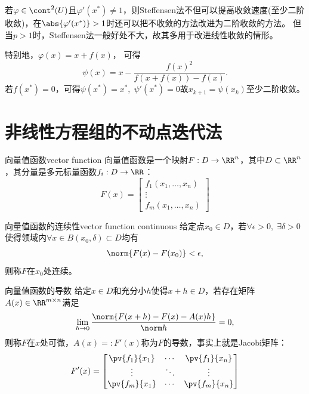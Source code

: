 \begin{remark}
    若$\varphi\in\cont^2(U)$且$\varphi'(x^*)\neq 1$，则Steffensen法不但可以提高收敛速度(至少二阶收敛)，在$\abs{\varphi'(x^*)}>1$时还可以把不收敛的方法改进为二阶收敛的方法。
    但当$p>1$时，Steffensen法一般好处不大，故其多用于改进线性收敛的情形。
\end{remark}

\begin{example}
    {}{}
    特别地，$\varphi(x)=x+f(x)$，
    可得
    \begin{equation}
        \psi(x)=x-\frac{f(x)^2}{f(x+f(x))-f(x)}.
    \end{equation}
    若$f(x^*)=0$，可得$\psi(x^*)=x^*,\;\psi'(x^*)=0$故$x_{k+1}=\psi(x_k)$至少二阶收敛。
\end{example}

\section{非线性方程组的不动点迭代法}

\begin{definition}
    {向量值函数}{vector function}
    向量值函数是一个映射$F:D\to\RR^n$，其中$D\subset\RR^n$，其分量是多元标量函数$f_i:D\to\RR$：
    \begin{equation}
        F(x)=\begin{bmatrix}
            f_1(x_1,\ldots,x_n)\\\vdots\\f_m(x_1,\ldots,x_n)
        \end{bmatrix}
    \end{equation}
\end{definition}

\begin{definition}
    {向量值函数的连续性}{vector function continuous}
    给定点$x_0\in D$，若$\forall\epsilon>0,\;\exists\delta>0$使得领域内$\forall x\in B(x_0,\delta)\subset D$均有
    \[
        \norm{F(x)-F(x_0)}<\epsilon,
    \]
    则称$F$在$x_0$处连续。
\end{definition}

\begin{definition}
    {向量值函数的导数}{}
    给定$x\in D$和充分小$h$使得$x+h\in D$，若存在矩阵$A(x)\in\RR^{m\times n}$满足 
    \begin{equation}
        \lim_{h\to 0}\frac{\norm{F(x+h)-F(x)-A(x)h}}{\norm h}=0,
    \end{equation}
    则称$F$在$x$处可微，$A(x)=:F'(x)$称为$F$的导数，事实上就是Jacobi矩阵：
    \begin{equation}
        F'(x)=\begin{bmatrix}
            \pv{f_1}{x_1}&\cdots&\pv{f_1}{x_n}\\
            \vdots&\ddots&\vdots\\
            \pv{f_m}{x_1}&\cdots&\pv{f_m}{x_n}
        \end{bmatrix}
    \end{equation}
\end{definition}

